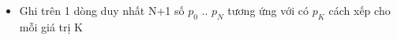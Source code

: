 \begin{itemize}
	\item Ghi trên 1 dòng duy nhất N+1 số $p_{0}$ .. $p_{N}$ tương ứng với có $p_{K}$ cách xếp cho mỗi giá trị K
\end{itemize}